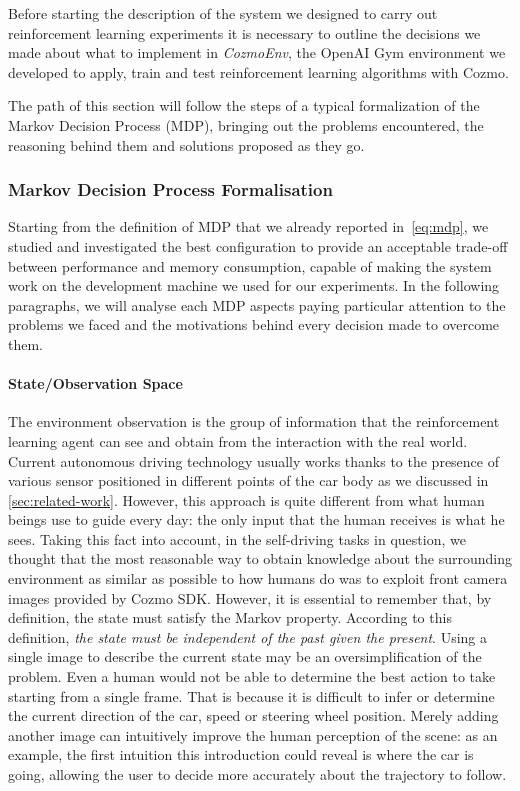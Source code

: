 Before starting the description of the system we designed to carry out reinforcement learning experiments it is necessary to outline the decisions we made about what to implement in \textit{CozmoEnv}, the OpenAI Gym environment we developed to apply, train and test reinforcement learning algorithms with Cozmo.

The path of this section will follow the steps of a typical formalization of the Markov Decision Process (MDP), bringing out the problems encountered, the reasoning behind them and solutions proposed as they go.

\subsubsection{Markov Decision Process Formalisation}

Starting from the definition of MDP that we already reported in~\vref{eq:mdp}, we studied and investigated the best configuration to provide an acceptable trade-off between performance and memory consumption, capable of making the system work on the development machine we used for our experiments.
In the following paragraphs, we will analyse each MDP aspects paying particular attention to the problems we faced and the motivations behind every decision made to overcome them.

\paragraph{State/Observation Space}
The environment observation is the group of information that the reinforcement learning agent can see and obtain from the interaction with the real world.
Current autonomous driving technology usually works thanks to the presence of various sensor positioned in different points of the car body as we discussed in \vref{sec:related-work}.
However, this approach is quite different from what human beings use to guide every day: the only input that the human receives is what he sees.
Taking this fact into account, in the self-driving tasks in question, we thought that the most reasonable way to obtain knowledge about the surrounding environment as similar as possible to how humans do was to exploit front camera images provided by Cozmo SDK.
However, it is essential to remember that, by definition, the state must satisfy the Markov property.
According to this definition, \textit{the state must be independent of the past given the present}.
Using a single image to describe the current state may be an oversimplification of the problem.
Even a human would not be able to determine the best action to take starting from a single frame.
That is because it is difficult to infer or determine the current direction of the car, speed or steering wheel position.
Merely adding another image can intuitively improve the human perception of the scene: as an example, the first intuition this introduction could reveal is where the car is going, allowing the user to decide more accurately about the trajectory to follow.

